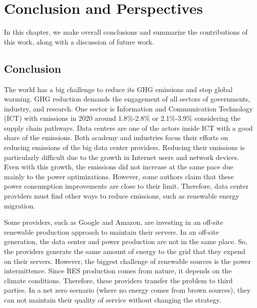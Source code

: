 \chapter{Conclusion and Perspectives}
\label{cha:conclusion}

In this chapter, we make overall conclusions and summarize the contributions of this work, along with a discussion of future work.

\section{Conclusion}

The world has a big challenge to reduce its GHG emissions and stop global warming. GHG reduction demands the engagement of all sectors of governments, industry, and research. One sector is Information and Communication Technology (ICT) with emissions in 2020 around 1.8\%-2.8\% or 2.1\%-3.9\% considering the supply chain pathways. Data centers are one of the actors inside ICT with a good share of the emissions. Both academy and industries focus their efforts on reducing emissions of the big data center providers. Reducing their emissions is particularly difficult due to the growth in Internet users and network devices. Even with this growth, the emissions did not increase at the same pace due mainly to the power optimizations. However, some authors claim that these power consumption improvements are close to their limit. Therefore, data center providers must find other ways to reduce emissions, such as renewable energy migration.

Some providers, such as Google and Amazon, are investing in an off-site renewable production approach to maintain their servers. In an off-site generation, the data center and power production are not in the same place. So, the providers generate the same amount of energy to the grid that they expend on their servers. However, the biggest challenge of renewable sources is the power intermittence. Since RES production comes from nature, it depends on the climate conditions. Therefore, these providers transfer the problem to third parties. In a net zero scenario (where no energy comes from brown sources), they can not maintain their quality of service without changing the strategy. 

